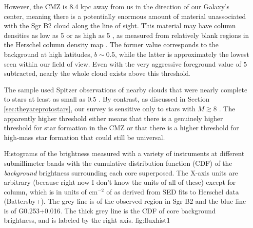 \documentclass{emulateapj}
\begin{document}
However, the CMZ is 8.4 kpc away from us in the direction of our Galaxy's
center, meaning there is a potentially enormous amount of material unassociated
with the Sgr B2 cloud along the line of sight.  This material may have column
densities as low as
5 \persc or as high as 5 \persc, as measured from relatively
blank regions in the Herschel column density map \citep{Battersby2011a}.  The
former value corresponds to
the background at high latitudes, $b\sim0.5$, while the latter  is
approximately the lowest seen within our field of view. 
Even with the very aggressive foreground value of 5 \persc subtracted,
nearly the whole cloud exists above this threshold.

The \citet{Lada2010a} sample used Spitzer observations of nearby clouds that
were nearly complete to stars at least as small as 0.5 \msun.  By contrast, as
discussed in Section \ref{sec:theyareprotostars}, our survey is sensitive only
to stars with $M\gtrsim8$ \msun.  The apparently higher threshold either means
that there is a genuinely higher threshold for star formation in the CMZ or
that there is a higher threshold for high-mass star formation that could still
be universal.


{Histograms of the brightness measured with a variety of instruments at
different submillimeter bands with the cumulative distribution function (CDF)
of the \emph{background} brightness surrounding each core superposed.  The
X-axis units are arbitrary (because right now I don't know the units of all of
these) except for column, which is in units of cm$^{-2}$ of \hh as derived from
SED fits to Herschel data (Battersby+).  The grey line is of the observed
region in Sgr B2 and the blue line is of G0.253+0.016.  The thick grey line is
the CDF of core background brightness, and is labeled by the right axis.}
{fig:fluxhist}{1}{\textwidth}





\appendix
\end{document}
